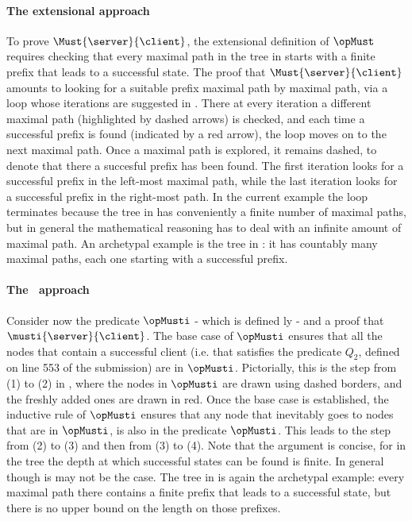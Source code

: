 

\paragraph{The extensional approach}
To prove $\Must{\server}{\client}$, the extensional definition of
$\opMust$ requires checking that every maximal path in the tree in
 starts with a finite prefix that leads to a
successful state.
The proof that $\Must{\server}{\client}$ amounts to looking
for a suitable prefix maximal path by maximal path, via a loop whose
iterations are suggested in .
There at every iteration a different maximal path (highlighted by
dashed arrows) is checked, and each time a successful prefix is found
(indicated by a red arrow), the loop moves on to the next  maximal
path. Once a maximal path is explored, it remains dashed, to denote
that there a succesful prefix has been found.
The first iteration looks for a successful prefix in the left-most
maximal path, while the last iteration looks
for a successful prefix in the right-most path.
In the current example the loop terminates because the tree in
 has conveniently a finite number of maximal
paths, but in general the mathematical reasoning has to deal with
an infinite amount of maximal path. An archetypal example is the tree in
: it has countably many maximal paths, each one
starting with a successful prefix.



\paragraph{The \intentional\ approach}
Consider now the predicate $\opMusti$ - which is defined \intentional ly -
and a proof that $\musti{\server}{\client}$.
The base case of $\opMusti$ ensures that all the nodes that contain a
successful client (i.e. that satisfies the predicate $Q_2$, defined on
line 553 of the submission) are in $\opMusti$. Pictorially, this is the
step from (1) to (2) in , where the
nodes in $\opMusti$ are drawn using dashed borders, and the freshly
added ones are drawn in red.
Once the base case is established, the inductive rule of $\opMusti$
ensures that any node that inevitably goes to nodes that are in
$\opMusti$, is also in the predicate $\opMusti$. This leads to the step
from (2) to (3) and then from (3) to (4).
Note that the argument is concise, for in the tree the depth at which
successful states can be found is finite. In general though is may not
be the case. The tree in  is again the archetypal
example: every maximal path there contains a finite prefix that leads
to a successful state, but there is no upper bound on
the length on those prefixes.


